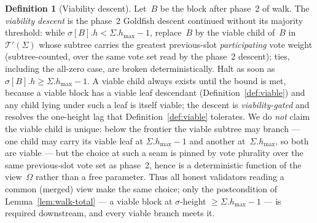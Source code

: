 \ifx\litemode\undefined\documentclass{article}\fi
\newcommand{\hmax}{\ensuremath{h_{\max}}\xspace}
\newcommand{\viableTree}{\ensuremath{\mathcal{T}'}}
\newcommand{\walk}{\textsf{walk}\xspace}
\theoremstyle{plain}
\theoremstyle{definition}
\newtheorem{definition}{Definition}
\theoremstyle{remark}
\begin{document}
\begin{definition}[Viability descent]\label{def:viability-descent}
Let~$B$ be the block after phase~2 of \walk.  The \emph{viability descent}
is the phase~2 Goldfish descent continued without its majority threshold: while
$\sigma[B].h < \Sigma.\hmax - 1$, replace~$B$ by the viable child of~$B$
in~$\viableTree(\Sigma)$ whose subtree carries the greatest previous-slot
\emph{participating} vote weight (subtree-counted, over the same vote set
read by the phase~2 descent); ties, including the all-zero case, are broken
deterministically.  Halt as soon as $\sigma[B].h \geq \Sigma.\hmax - 1$.  A
viable child always exists until the bound is met, because a viable block has
a viable leaf descendant (Definition~\ref{def:viable}) and any child lying
under such a leaf is itself viable; the descent is \emph{viability-gated}
and resolves the one-height lag that Definition~\ref{def:viable} tolerates.
We do \emph{not} claim the viable child is unique: below the frontier the
viable subtree may branch --- one child may carry its viable leaf at
$\Sigma.\hmax - 1$ and another at~$\Sigma.\hmax$, so both are viable --- but
the choice at such a seam is pinned by vote plurality over the same
previous-slot vote set as phase~2, hence is a deterministic function of the
view~$\Omega$ rather than a free parameter.  Thus all honest validators
reading a common (merged) view make the same choice; only the postcondition
of Lemma~\ref{lem:walk-total} --- a viable block at $\sigma$-height
$\geq \Sigma.\hmax - 1$ --- is required downstream, and every viable branch
meets it.
\end{definition}
\end{document}
